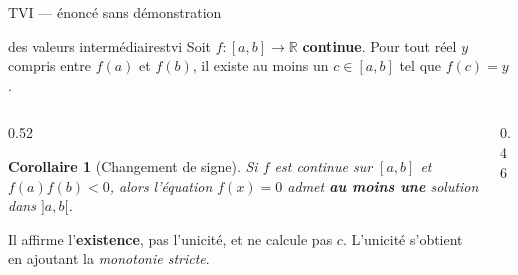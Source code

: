 \documentclass[10pt,aspectratio=169]{beamer}
\newtheorem{coro}{Corollaire}
\numberwithin{dummy}{section}
\newcommand{\R}{\mathbb{R}}
\begin{document}
\begin{frame}{TVI --- énoncé sans démonstration}
\begin{mytheo}{des valeurs intermédiaires}{tvi}
Soit $f:[a,b]\to\R$ \textbf{continue}. Pour tout réel $y$ compris entre $f(a)$ et $f(b)$,
il existe au moins un $c\in[a,b]$ tel que $f(c)=y$.
\end{mytheo}

\vspace{0.2em}
\begin{columns}[T]
\begin{column}{0.52\textwidth}
\begin{coro}[Changement de signe]
Si $f$ est continue sur $[a,b]$ et $f(a)f(b)<0$,
alors l'équation $f(x)=0$ admet \textbf{au moins une} solution dans $]a,b[$.
\end{coro}
\vspace{0.2em}
\begin{boxattention}
Il affirme l'\textbf{existence}, pas l'unicité, et ne calcule pas $c$.
L'unicité s'obtient en ajoutant la \emph{monotonie stricte}.
\end{boxattention}
\end{column}
\begin{column}{0.46\textwidth}
\centering
{}
\end{column}
\end{columns}
\end{frame}
\end{document}
